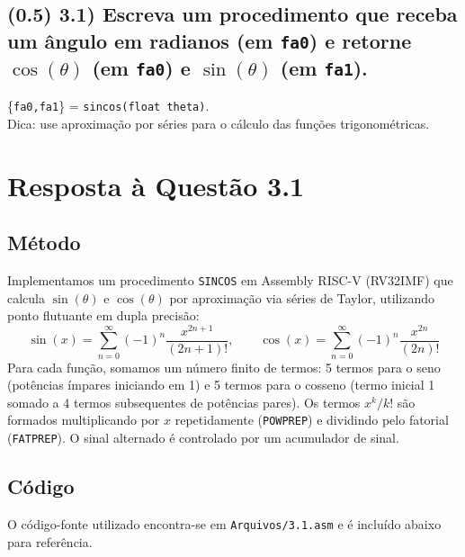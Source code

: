\documentclass[12pt,a4paper]{article}
\begin{document}
\subsection*{(0.5) 3.1) Escreva um procedimento que receba um ângulo em radianos (em \texttt{fa0}) e retorne $\cos(\theta)$ (em \texttt{fa0}) e $\sin(\theta)$ (em \texttt{fa1}).}

\{\texttt{fa0,fa1}\} = \texttt{sincos(float theta)}. \\
Dica: use aproximação por séries para o cálculo das funções trigonométricas.

\section*{Resposta à Questão 3.1}

\subsection*{Método}
Implementamos um procedimento \texttt{SINCOS} em Assembly RISC-V (RV32IMF) que calcula $\sin(\theta)$ e $\cos(\theta)$ por aproximação via séries de Taylor, utilizando ponto flutuante em dupla precisão:
\[
\sin(x) = \sum_{n=0}^{\infty} (-1)^n \frac{x^{2n+1}}{(2n+1)!},\qquad
\cos(x) = \sum_{n=0}^{\infty} (-1)^n \frac{x^{2n}}{(2n)!}
\]
Para cada função, somamos um número finito de termos: 5 termos para o seno (potências ímpares iniciando em 1) e 5 termos para o cosseno (termo inicial 1 somado a 4 termos subsequentes de potências pares). Os termos \(x^k/k!\) são formados multiplicando por \(x\) repetidamente (\texttt{POWPREP}) e dividindo pelo fatorial (\texttt{FATPREP}). O sinal alternado é controlado por um acumulador de sinal.

\subsection*{Código}
O código-fonte utilizado encontra-se em \texttt{Arquivos/3.1.asm} e é incluído abaixo para referência.
\end{document}
